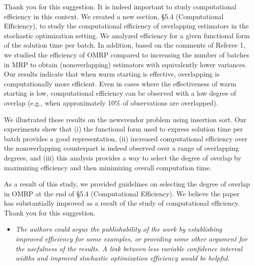 \documentclass[11pt,notitlepage,onecolumn]{article}
\newcommand{\noi}{\noindent}
\begin{document}
\noi 
Thank you for this suggestion. 
It is indeed important to study computational efficiency in this context. 
We created a new section, \S 5.4 (Computational Efficiency), to study the computational efficiency of overlapping estimators in the stochastic optimization setting. 
We analyzed efficiency for a given functional form of the solution time per batch. 
In addition, based on the comments of Referee 1, we studied the efficiency of OMRP compared to increasing the number of batches in MRP to obtain (nonoverlapping) estimators with equivalently lower variances. 
Our results indicate that when warm starting is effective, overlapping is computationally more efficient.
Even in cases where the effectiveness of warm starting is low, computational efficiency can be observed with a low degree of overlap (e.g., when approximately 10\% of observations are overlapped).\medskip 

\noi 
We illustrated these results on the newsvendor problem using insertion sort. 
Our experiments show that (i) the functional form used to express solution time per batch provides a good representation, (ii) increased computational efficiency over the nonoverlapping counterpart is indeed observed over a range of overlapping degrees, and (iii) this analysis provides a way to select the degree of overlap by maximizing efficiency and then minimizing overall computation time.\bigskip 
 
\noi
As a result of this study, we provided guidelines on selecting the degree of overlap in OMRP at the end of \S 5.4 (Computational Efficiency).  
We believe the paper has substantially improved as a result of the study of computational efficiency. 
Thank you for this suggestion. 
\medskip 


\begin{itemize}
\item[] \textit{The authors could argue the publishability of the work by establishing improved efficiency for some examples, or providing some other argument for the usefulness of the results.  
A link between less variable confidence interval widths and improved stochastic optimization efficiency would be helpful.}
\end{itemize}
\end{document}
